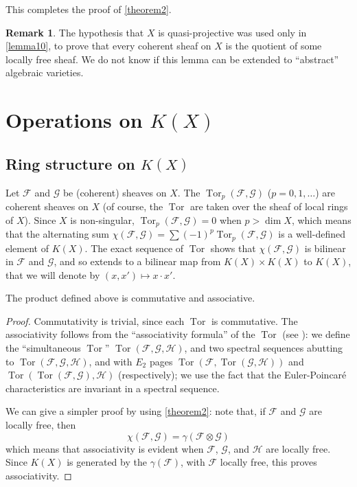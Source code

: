 \documentclass{article}
\theoremstyle{plain}
\newenvironment{proposition}[1]
    {\renewcommand\theinnercustomproposition{#1}\innercustomproposition}
    {\endinnercustomproposition}
\theoremstyle{definition}
\newtheorem*{remark}{Remark}
\newcommand{\sh}{\mathscr}
\DeclareMathOperator{\Tor}{Tor}
\newcommand{\oldpage}[1]{\marginpar{\footnotesize$\Big\vert$ \textit{p.~#1}}}
\begin{document}
This completes the proof of \cref{theorem2}.

\begin{remark}
  The hypothesis that $X$ is quasi-projective was used only in \cref{lemma10}, to prove that every coherent sheaf on $X$ is the quotient of some locally free sheaf.
  We do not know if this lemma can be extended to ``abstract'' algebraic varieties.
\end{remark}


\section{Operations on $K(X)$}
\label{section5}

\subsection{Ring structure on $K(X)$}
\label{subsection5a}

Let $\sh{F}$ and $\sh{G}$ be (coherent) sheaves on $X$.
The $\Tor_p(\sh{F},\sh{G})$ ($p=0,1,\ldots$) are coherent sheaves on $X$ (of course, the $\Tor$
\oldpage{109}
are taken over the sheaf of local rings of $X$).
Since $X$ is non-singular, $\Tor_p(\sh{F},\sh{G})=0$ when $p>\dim X$, which means that the alternating sum $\chi(\sh{F},\sh{G})=\sum(-1)^p\Tor_p(\sh{F},\sh{G})$ is a well-defined element of $K(X)$.
The exact sequence of $\Tor$ shows that $\chi(\sh{F},\sh{G})$ is bilinear in $\sh{F}$ and $\sh{G}$, and so extends to a bilinear map from $K(X)\times K(X)$ to $K(X)$, that we will denote by $(x,x')\mapsto x\cdot x'$.

\begin{proposition}{6}
\label{proposition6}
  The product defined above is commutative and associative.
\end{proposition}

\begin{proof}
  Commutativity is trivial, since each $\Tor$ is commutative.
  The associativity follows from the ``associativity formula'' of the $\Tor$ (see \cite{3}):
  we define the ``simultaneous $\Tor$'' $\Tor(\sh{F},\sh{G},\sh{H})$, and two spectral sequences abutting to $\Tor(\sh{F},\sh{G},\sh{H})$, and with $E_2$ pages $\Tor(\sh{F},\Tor(\sh{G},\sh{H}))$ and $\Tor(\Tor(\sh{F},\sh{G}),\sh{H})$ (respectively);
  we use the fact that the Euler-Poincar\'{e} characteristics are invariant in a spectral sequence.

  We can give a simpler proof by using \cref{theorem2}:
  note that, if $\sh{F}$ and $\sh{G}$ are locally free, then
  \[
    \chi(\sh{F},\sh{G}) = \gamma(\sh{F}\otimes\sh{G})
  \]
  which means that associativity is evident when $\sh{F}$, $\sh{G}$, and $\sh{H}$ are locally free.
  Since $K(X)$ is generated by the $\gamma(\sh{F})$, with $\sh{F}$ locally free, this proves associativity.
\end{proof}
\end{document}
